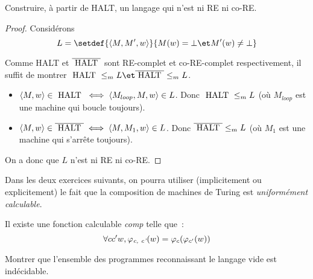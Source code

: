 \begin{exercice}
	Construire, à partir de HALT, un langage qui n'est ni RE ni co-RE.
\end{exercice}

\begin{proof}
	Considérons
	$$ L = \setdef {\encode {M,M',w}} {M(w) = \bot \et M'(w) \neq \bot} $$

	Comme HALT et $\overline {\halt}$ sont RE-complet et co-RE-complet respectivement, il suffit de montrer $\halt \leqm L \et \overline{\halt} \leqm L$.

	\begin{itemize}
		\item $\encode {M,w} \in \halt \iff \encode {M_{loop}, M, w} \in L$. Donc $\halt \leqm L$ (où $M_{loop}$ est une machine qui boucle toujours).
		\item $\encode {M,w} \in \overline{\halt} \iff \encode {M, M_1, w} \in L$. Donc $\overline{\halt} \leqm L$ (où $M_1$ est une machine qui s'arrête toujours).
	\end{itemize}

	On a donc que $L$ n'est ni RE ni co-RE.
\end{proof}

Dans les deux exercices suivants, on pourra utiliser (implicitement ou explicitement) le fait que la composition de machines de Turing est \emph{uniformément calculable}.
\begin{lemma}\label{lem:comp}
	Il existe une fonction calculable \emph{comp} telle que :
	$$\forall c c' w, \phi_{\emph{c, c'}}(w) = \phi_c(\phi_{c'}(w))$$
\end{lemma}


\begin{exercice}
	Montrer que l'ensemble des programmes reconnaissant le langage vide est indécidable.
\end{exercice}

